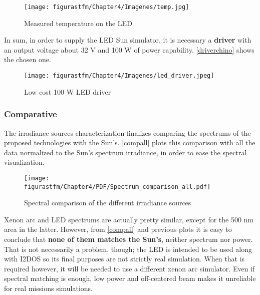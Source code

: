 \begin{figure} [H]
			\centering
			\texttt{[image: figurastfm/Chapter4/Imagenes/temp.jpg]}
			\caption{Measured temperature on the \acrshort{LED}} \label{temp}
						\vspace{-0.7cm}
\end{figure}
In sum, in order to supply the \acrshort{LED} Sun simulator, it is necessary a \textbf{driver} with an output voltage about 32 V and 100 W of power capability. \autoref{driverchino} shows the chosen one.

\begin{figure} [H]
			\centering
			\texttt{[image: figurastfm/Chapter4/Imagenes/led\_driver.jpeg]}
			\caption{Low cost 100 W \acrshort{LED} driver} \label{driverchino}
\end{figure}


\subsubsection{Comparative}

The irradiance sources characterization finalizes comparing the spectrums of the proposed technologies with the Sun's. \autoref{compall} plots this comparison with all the data normalized to the Sun's spectrum irradiance, in order to ease the spectral visualization.


\begin{figure} [H]
			\centering
			\texttt{[image: figurastfm/Chapter4/PDF/Spectrum\_comparison\_all.pdf]}
			\caption{Spectral comparison of the different irradiance sources} \label{compall}
\end{figure}

Xenon arc and \acrshort{LED} spectrums are actually pretty similar, except for the 500 nm area in the latter. However, from \autoref{compall} and previous plots it is easy to conclude that \textbf{none of them matches the Sun's}, neither spectrum nor power. That is not necessarily a problem, though; the \acrshort{LED} is intended to be used along with \acrshort{I2DOS} so its final purposes are not strictly real simulation. When that is required however, it will be needed to use a different xenon arc simulator. Even if spectral matching is enough, low power and off-centered beam makes it unreliable for real missions simulations.


